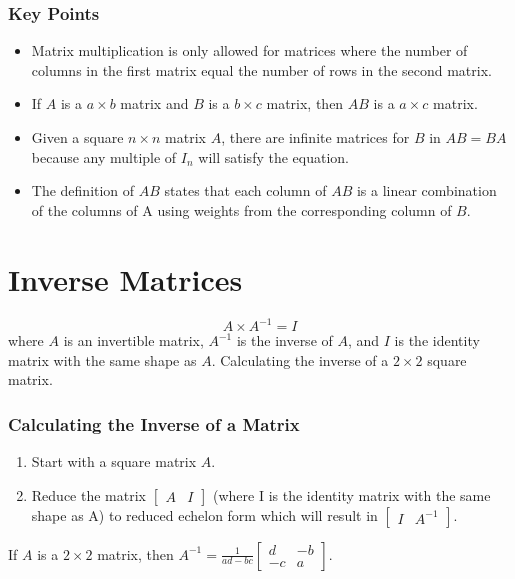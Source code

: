 \documentclass{article}
\begin{document}
\subsubsection*{Key Points}
\begin{itemize}
    \item Matrix multiplication is only allowed for matrices where the number of columns in the
    first matrix equal the number of rows in the second matrix.
    \item If $A$ is a $a\times b$ matrix and $B$ is a $b \times c$ matrix, then $AB$ is a
    $a \times c$ matrix.
    \item Given a square $n\times n$ matrix $A$, there are infinite matrices for $B$ in $AB=BA$
    because any multiple of $I_n$ will satisfy the equation.
    \item The definition of $AB$ states that each column of $AB$ is a linear combination of the
    columns of A using weights from the corresponding column of $B$.
\end{itemize}

\section*{Inverse Matrices}
\[A\times A^{-1}=I\]
where $A$ is an invertible matrix, $A^{-1}$ is the inverse of $A$, and $I$ is the identity matrix
with the same shape as $A$.
Calculating the inverse of a $2\times 2$ square matrix.

\subsubsection*{Calculating the Inverse of a Matrix}
\begin{enumerate}
    \item Start with a square matrix $A$.
    \item Reduce the matrix $\begin{bmatrix} A & I \end{bmatrix}$ (where I is the identity matrix
    with the same shape as A) to reduced echelon form which will result in
    $\begin{bmatrix} I & A^{-1} \end{bmatrix}$.
\end{enumerate}

If $A$ is a $2\times 2$ matrix, then
$A^{-1}=\frac{1}{ad-bc}\begin{bmatrix} d & -b \\ -c & a \end{bmatrix}$. \\
\end{document}
